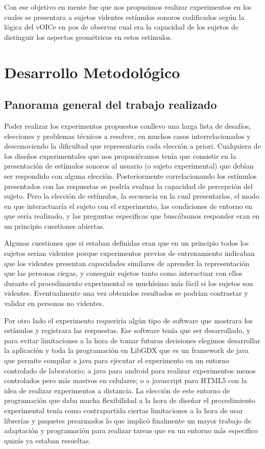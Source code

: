 \documentclass{article}
\begin{document}
    Con ese objetivo en mente fue que nos propusimos realizar experimentos en los cuales se presentara a sujetos videntes estímulos sonoros codificados según la lógica del vOICe en pos de observar cual era la capacidad de los sujetos de distinguir los aspectos geométricos en estos estímulos. 


\section{Desarrollo Metodológico}

\subsection{Panorama general del trabajo realizado}

    Poder realizar los experimentos propuestos conllevo una larga lista de desafíos, elecciones y problemas técnicos a resolver, en muchos casos interrelacionados y desconociendo la dificultad que representaría cada elección a priori. Cualquiera de los diseños experimentales que nos propusiéramos tenía que consistir en la presentación de estímulos sonoros al usuario (o sujeto experimental) que debían ser respondido con alguna elección. Posteriormente correlacionando los estímulos presentados con las respuestas se podría evaluar la capacidad de percepción del sujeto. Pero la elección de estímulos, la secuencia en la cual presentarlos, el modo en que interactuaría el sujeto con el experimento, las condiciones de entorno en que sería realizado, y las preguntas especificas que buscábamos responder eran en un principio cuestiones abiertas.
    
    Algunas cuestiones que si estaban definidas eran que en un principio todos los sujetos serian videntes porque experimentos previos de entrenamiento \cite{VoiceEntrenamiento3} indicaban que los videntes presentan capacidades similares de aprender la representación que las personas ciegas, y conseguir sujetos tanto como interactuar con ellos durante el procedimiento experimental es muchísimo más fácil si los sujetos son videntes. Eventualmente una vez obtenidos resultados se podrían contrastar y validar en personas no videntes. 
    
    Por otro lado el experimento requeriría algún tipo de software que mostrara los estímulos y registrara las respuestas. Ese software tenía que ser desarrollado, y para evitar limitaciones a la hora de tomar futuras decisiones elegimos desarrollar la aplicación y toda la programación en LibGDX que es un framework de java que permite compilar a java para ejecutar el experimento en un entorno controlado de laboratorio; a java para android para realizar experimentos menos controlados pero más masivos en celulares; o a javascript para HTML5 con la idea de realizar experimentos a distancia. 
    La elección de este entorno de programación que daba mucha flexibilidad a la hora de diseñar el procedimiento experimental tenía como contrapartida ciertas limitaciones a la hora de usar librerías y paquetes prearmados lo que implicó finalmente un mayor trabajo de adaptación y programación para realizar tareas que en un entorno más especifico quizás ya estaban resueltas. 
    
\end{document}

